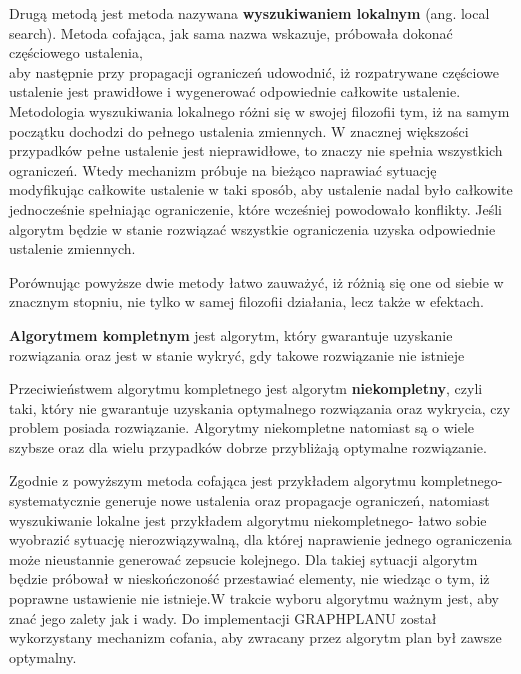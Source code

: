     Drugą metodą jest metoda nazywana \textbf{wyszukiwaniem lokalnym} (ang. local search). Metoda cofająca, jak sama nazwa wskazuje, próbowała dokonać 
    częściowego ustalenia, \\
    aby następnie przy propagacji ograniczeń udowodnić, iż rozpatrywane częściowe ustalenie jest prawidłowe 
    i wygenerować odpowiednie całkowite ustalenie. Metodologia wyszukiwania lokalnego różni się w swojej filozofii tym, iż na samym 
    początku dochodzi do pełnego ustalenia zmiennych. W znacznej większości przypadków pełne ustalenie jest 
    nieprawidłowe, to znaczy nie spełnia wszystkich ograniczeń. Wtedy mechanizm próbuje na bieżąco naprawiać sytuację modyfikując całkowite ustalenie w taki 
    sposób, aby ustalenie nadal było całkowite jednocześnie spełniając ograniczenie, które wcześniej powodowało konflikty. Jeśli algorytm będzie
    w stanie 
    rozwiązać wszystkie ograniczenia uzyska odpowiednie ustalenie zmiennych.

    Porównując powyższe dwie metody łatwo zauważyć, iż różnią się one od siebie w znacznym stopniu, nie tylko w samej filozofii działania, lecz także 
    w efektach.

    \begin{definition}
        \label{AlgorytmKompletny}
        \textbf{Algorytmem kompletnym} jest algorytm, który gwarantuje uzyskanie rozwiązania oraz jest w stanie 
        wykryć, gdy takowe rozwiązanie nie istnieje
    \end{definition}

    Przeciwieństwem algorytmu kompletnego jest algorytm \textbf{niekompletny}, czyli taki, który nie gwarantuje 
    uzyskania optymalnego rozwiązania oraz wykrycia, czy problem posiada rozwiązanie. Algorytmy niekompletne natomiast są o wiele 
    szybsze oraz dla wielu przypadków dobrze przybliżają optymalne rozwiązanie. 

    Zgodnie z powyższym metoda cofająca jest przykładem algorytmu kompletnego- systematycznie generuje nowe ustalenia oraz propagacje ograniczeń,
    natomiast wyszukiwanie lokalne jest przykładem algorytmu niekompletnego- łatwo sobie wyobrazić sytuację nierozwiązywalną, dla której naprawienie jednego ograniczenia 
    może nieustannie generować zepsucie kolejnego. Dla takiej sytuacji algorytm będzie próbował w nieskończoność przestawiać elementy, 
    nie wiedząc o tym, iż poprawne ustawienie nie istnieje.W trakcie wyboru algorytmu ważnym jest, aby znać jego zalety jak i wady. Do implementacji 
    GRAPHPLANU został wykorzystany mechanizm cofania, aby zwracany przez algorytm plan był zawsze optymalny.

